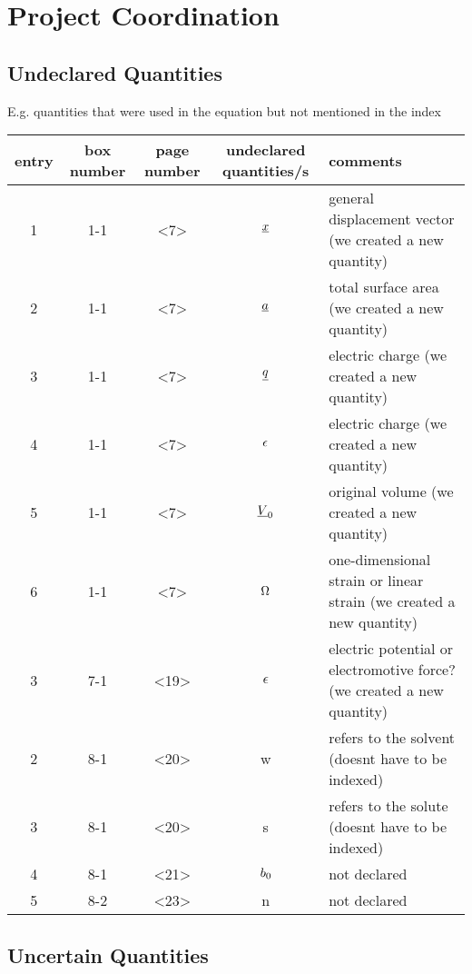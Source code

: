 \section{Project Coordination}

\subsection{Undeclared Quantities}

E.g. quantities that were used in the equation but not mentioned in the index \\

\begin{longtable} { | c | c | c | c | p{6cm} | } 
 \hline
    entry & box number & page number
    & undeclared quantities/s 
    & comments \\
 \hline 
 	 1 & 1-1 & <7> & $\gendisp$ &  general displacement vector (we created a new quantity) \\ \hline
     2 & 1-1 & <7> & $\totalsa$ &  total surface area (we created a new quantity) \\ \hline
     3 & 1-1 & <7> & $\eleccharge$ &  electric charge (we created a new quantity) \\ \hline
     4 & 1-1 & <7> & $\elecpot$ &  electric charge (we created a new quantity) \\ \hline
     5 & 1-1 & <7> & $\origvol$ &  original volume (we created a new quantity) \\ \hline
     6 & 1-1 & <7> & $\linstrain$ &  one-dimensional strain or linear strain (we created a new quantity) \\ \hline
  	 3 & 7-1 & <19> & $\epsilon$ &  electric potential or electromotive force? (we created a new quantity) \\ \hline
     2 & 8-1 & <20> & w &  refers to the solvent (doesnt have to be indexed) \\ \hline
     3 & 8-1 & <20> & s &  refers to the solute (doesnt have to be indexed)\\ \hline
     4 & 8-1 & <21> & $b_{\init}$ &  not declared \\ \hline
 	 5 & 8-2 & <23> & n &  not declared \\ \hline
 
\end{longtable}

\subsection{Uncertain Quantities}

